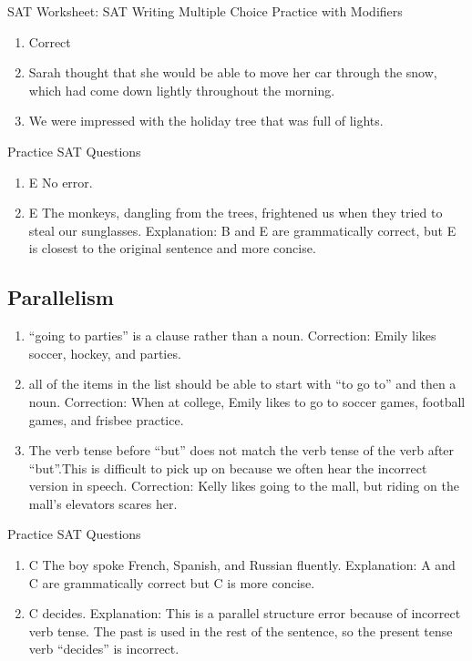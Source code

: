 \bigskip SAT Worksheet: SAT Writing Multiple Choice Practice with Modifiers

\begin{enumerate}
\item Correct

\item Sarah thought that she would be able to move her car through the snow, which had come down lightly throughout the morning.

\item We were impressed with the holiday tree that was full of lights.
\end{enumerate}

Practice SAT Questions

\begin{enumerate}
\item E No error. 
\item E The monkeys, dangling from the trees, frightened us when they tried to steal our sunglasses. Explanation: B and E are grammatically correct, but E is closest to the original sentence and more concise.
\end{enumerate}

\subsection{Parallelism}

\begin{enumerate}
\item ``going to parties'' is a clause rather than a noun. Correction: Emily likes soccer, hockey, and parties. 

\item all of the items in the list should be able to start with ``to go to'' and then a noun. Correction: When at college, Emily likes to go to soccer games, football games, and frisbee practice. 

\item The verb tense before ``but'' does not match the verb tense of the verb after ``but''.This is difficult to pick up on because we often hear the incorrect version in speech. Correction: Kelly likes going to the mall, but riding on the mall's elevators scares her.
\end{enumerate}

\bigskip
Practice SAT Questions

\begin{enumerate}
\item C The boy spoke French, Spanish, and Russian fluently. Explanation: A and C are grammatically correct but C is more concise. 

\item C decides. Explanation: This is a parallel structure error because of incorrect verb tense. The past is used in the rest of the sentence, so the present tense verb ``decides'' is incorrect. 

\end{enumerate}

